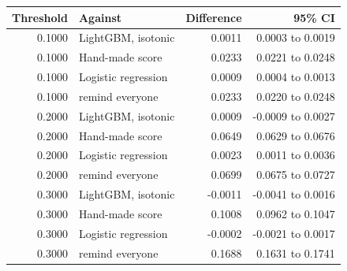 \begin{tabular}{rlrr}
\toprule
Threshold & Against & Difference & 95\% CI \\
\midrule
0.1000 & LightGBM, isotonic & 0.0011 & 0.0003 to 0.0019 \\
0.1000 & Hand-made score & 0.0233 & 0.0221 to 0.0248 \\
0.1000 & Logistic regression & 0.0009 & 0.0004 to 0.0013 \\
0.1000 & remind everyone & 0.0233 & 0.0220 to 0.0248 \\
0.2000 & LightGBM, isotonic & 0.0009 & -0.0009 to 0.0027 \\
0.2000 & Hand-made score & 0.0649 & 0.0629 to 0.0676 \\
0.2000 & Logistic regression & 0.0023 & 0.0011 to 0.0036 \\
0.2000 & remind everyone & 0.0699 & 0.0675 to 0.0727 \\
0.3000 & LightGBM, isotonic & -0.0011 & -0.0041 to 0.0016 \\
0.3000 & Hand-made score & 0.1008 & 0.0962 to 0.1047 \\
0.3000 & Logistic regression & -0.0002 & -0.0021 to 0.0017 \\
0.3000 & remind everyone & 0.1688 & 0.1631 to 0.1741 \\
\bottomrule
\end{tabular}
